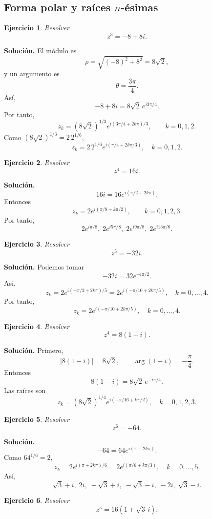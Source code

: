 \documentclass[12pt]{article}
\newtheorem{ejercicio}{Ejercicio}[section]
\begin{document}
\subsection*{Forma polar y raíces $n$-ésimas}

\begin{ejercicio}
Resolver
\[
z^3=-8+8i.
\]
\end{ejercicio}

\textbf{Solución.}
El módulo es
\[
\rho=\sqrt{(-8)^2+8^2}=8\sqrt2,
\]
y un argumento es
\[
\theta=\frac{3\pi}{4}.
\]
Así,
\[
-8+8i=8\sqrt2\,e^{i3\pi/4}.
\]
Por tanto,
\[
z_k=(8\sqrt2)^{1/3}
e^{i(3\pi/4+2k\pi)/3},\qquad k=0,1,2.
\]
Como $(8\sqrt2)^{1/3}=2\,2^{1/6}$,
\[
\boxed{
z_k=2\,2^{1/6}e^{i(\pi/4+2k\pi/3)},\quad k=0,1,2.
}
\]

\begin{ejercicio}
Resolver
\[
z^4=16i.
\]
\end{ejercicio}

\textbf{Solución.}
\[
16i=16e^{i(\pi/2+2k\pi)}.
\]
Entonces
\[
z_k=2e^{i(\pi/8+k\pi/2)},\qquad k=0,1,2,3.
\]
Por tanto,
\[
\boxed{
2e^{i\pi/8},\;
2e^{i5\pi/8},\;
2e^{i9\pi/8},\;
2e^{i13\pi/8}.
}
\]

\begin{ejercicio}
Resolver
\[
z^5=-32i.
\]
\end{ejercicio}

\textbf{Solución.}
Podemos tomar
\[
-32i=32e^{-i\pi/2}.
\]
Así,
\[
z_k=2e^{i(-\pi/2+2k\pi)/5}
=2e^{i(-\pi/10+2k\pi/5)},
\quad k=0,\ldots,4.
\]
Por tanto,
\[
\boxed{
z_k=2e^{i(-\pi/10+2k\pi/5)},\quad k=0,\ldots,4.
}
\]

\begin{ejercicio}
Resolver
\[
z^4=8(1-i).
\]
\end{ejercicio}

\textbf{Solución.}
Primero,
\[
|8(1-i)|=8\sqrt2,\qquad \arg(1-i)=-\frac{\pi}{4}.
\]
Entonces
\[
8(1-i)=8\sqrt2\,e^{-i\pi/4}.
\]
Las raíces son
\[
\boxed{
z_k=(8\sqrt2)^{1/4}
e^{i(-\pi/16+k\pi/2)},\quad k=0,1,2,3.
}
\]

\begin{ejercicio}
Resolver
\[
z^6=-64.
\]
\end{ejercicio}

\textbf{Solución.}
\[
-64=64e^{i(\pi+2k\pi)}.
\]
Como $64^{1/6}=2$,
\[
z_k=2e^{i(\pi+2k\pi)/6}
=2e^{i(\pi/6+k\pi/3)},
\quad k=0,\ldots,5.
\]
Así,
\[
\boxed{
\sqrt3+i,\;
2i,\;
-\sqrt3+i,\;
-\sqrt3-i,\;
-2i,\;
\sqrt3-i.
}
\]

\begin{ejercicio}
Resolver
\[
z^5=16(1+\sqrt3\,i).
\]
\end{ejercicio}
\end{document}
